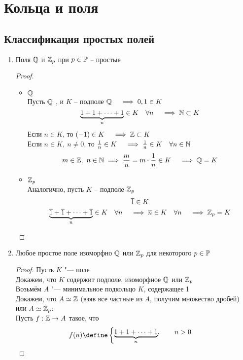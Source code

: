\chapter{Кольца и поля}

\section{Классификация простых полей}

\begin{theorem}
	\hfill
	\begin{enumerate}
		\item Поля $ \Q $ и $ \Z_p $ при $ p \in \Prime $ -- простые
		\begin{proof}
			\hfill
			\begin{itemize}
				\item $ \Q $ \\
				Пусть $ \Q $ , и $ K $ -- подполе $ \Q \quad \implies 0, 1 \in K $
				$$ \underbrace{1 + 1 + \dots + 1}_n \in K \quad \forall n \quad \implies \N \sub K $$
				Если $ n \in K $, то $ (-1) \in K \quad \implies \Z \sub K $ \\
				Если $ n \in K, ~ n \ne 0 $, то $ \frac1n \in K \quad \implies \frac1n \in K \quad \forall n \in \N $
				$$ m \in \Z, ~ n \in \N \implies \frac mn = m \cdot \frac1n \in K \quad \implies \Q = K $$
				\item $ \Z_p $ \\
				Аналогично, пусть $ K $ -- подполе $ \Z_p $
				$$ \ol1 \in K $$
				$$ \underbrace{\ol1 + \ol1 + \dots + \ol1}_n \in K \quad \forall n \quad \implies \ol n \in K \quad \forall n \quad \implies \Z_p = K $$
			\end{itemize}
		\end{proof}
		\item Любое простое поле изоморфно $ \Q $ или $ \Z_p $ для некоторого $ p \in \Prime $
		\begin{proof}
			Пусть $ K $ "--- поле \\
			Докажем, что $ K $ содержит подполе, изоморфное $ \Q $ или $ \Z_p $ \\
			Возьмём $ A $ "--- минимальное подкольцо $ K $, содержащее 1 \\
			Докажем, что $ A \simeq \Z $ (взяв все частные из $ A $, получим множество дробей) или $ A \simeq \Z_p $: \\
			Пусть $ f : \Z \to A $ такое, что
			$$ f(n) \define
			\begin{cases}
				\underbrace{1 + 1 + \dots + 1}_n, \qquad n > 0 \\

\end{cases}$$
\end{proof}
\end{enumerate}
\end{theorem}
